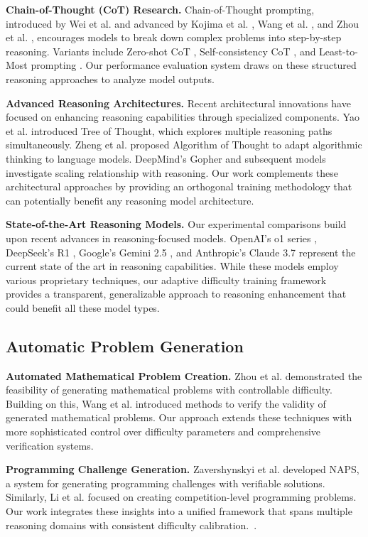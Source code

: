 \textbf{Chain-of-Thought (CoT) Research.} Chain-of-Thought prompting, introduced by Wei et al. \citep{wei2022chain} and advanced by Kojima et al. \citep{kojima2022large}, Wang et al. \citep{wang2022self,wang2023selfconsistency}, and Zhou et al. \citep{zhou2022least}, encourages models to break down complex problems into step-by-step reasoning. Variants include Zero-shot CoT \citep{kojima2022large}, Self-consistency CoT \citep{wang2022self}, and Least-to-Most prompting \citep{zhou2022least}. Our performance evaluation system draws on these structured reasoning approaches to analyze model outputs.

\textbf{Advanced Reasoning Architectures.} Recent architectural innovations have focused on enhancing reasoning capabilities through specialized components. Yao et al. \citep{yao2023tree} introduced Tree of Thought, which explores multiple reasoning paths simultaneously. Zheng et al. \citep{zheng2023algorithm} proposed Algorithm of Thought to adapt algorithmic thinking to language models. DeepMind's Gopher \citep{rae2021scaling} and subsequent models investigate scaling relationship with reasoning. Our work complements these architectural approaches by providing an orthogonal training methodology that can potentially benefit any reasoning model architecture.

\textbf{State-of-the-Art Reasoning Models.} Our experimental comparisons build upon recent advances in reasoning-focused models. OpenAI's o1 series \citep{openai2023gpt4}, DeepSeek's R1 \citep{deepseek2023r1}, Google's Gemini 2.5 \citep{google2023gemini}, and Anthropic's Claude 3.7 \citep{anthropic2023claude} represent the current state of the art in reasoning capabilities. While these models employ various proprietary techniques, our adaptive difficulty training framework provides a transparent, generalizable approach to reasoning enhancement that could benefit all these model types.

\subsection{Automatic Problem Generation}

\textbf{Automated Mathematical Problem Creation.} Zhou et al. \citep{zhou2020automatic} demonstrated the feasibility of generating mathematical problems with controllable difficulty. Building on this, Wang et al. \citep{wang2021automatic} introduced methods to verify the validity of generated mathematical problems. Our approach extends these techniques with more sophisticated control over difficulty parameters and comprehensive verification systems.

\textbf{Programming Challenge Generation.} Zavershynskyi et al. \citep{zavershynskyi2018naps} developed NAPS, a system for generating programming challenges with verifiable solutions. Similarly, Li et al. \citep{li2022competition} focused on creating competition-level programming problems. Our work integrates these insights into a unified framework that spans multiple reasoning domains with consistent difficulty calibration.~\cite{o1,r1,gpt3,gpt4,cot}.
